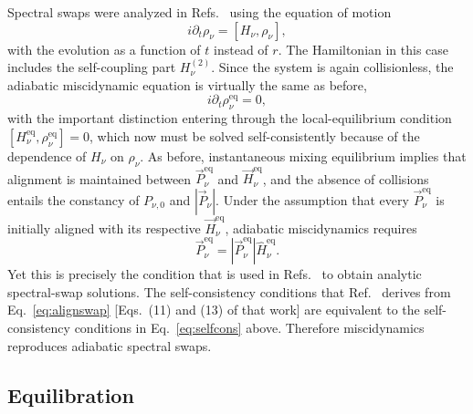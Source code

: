 \documentclass[aps,prd,twocolumn,groupedaddress,preprintnumbers]{revtex4-2}
\begin{document}
Spectral swaps were analyzed in Refs.~\cite{raffelt2007, raffelt2007c} using the equation of motion
\begin{equation}
    i \partial_t \rho_\nu = [H_\nu, \rho_\nu],
\end{equation}
with the evolution as a function of $t$ instead of $r$. The Hamiltonian in this case includes the self-coupling part $H_\nu^{(2)}$. Since the system is again collisionless, the adiabatic miscidynamic equation is virtually the same as before,
\begin{equation}
    i \partial_t \rho_\nu^\textrm{eq} = 0, \label{eq:miscswap}
\end{equation}
with the important distinction entering through the local-equilibrium condition $[H^{\textrm{eq}}_\nu, \rho^{\textrm{eq}}_\nu] = 0$, which now must be solved self-consistently because of the dependence of $H_\nu$ on $\rho_\nu$. As before, instantaneous mixing equilibrium implies that alignment is maintained between $\vec{P}_\nu^{\textrm{eq}}$ and $\vec{H}_\nu^{\textrm{eq}}$, and the absence of collisions entails the constancy of $P_{\nu,0}$ and $|\vec{P}_\nu|$. Under the assumption that every $\vec{P}_\nu^{\textrm{eq}}$ is initially aligned with its respective $\vec{H}_\nu^{\textrm{eq}}$, adiabatic miscidynamics requires
\begin{equation}
    \vec{P}_\nu^{\textrm{eq}} = |\vec{P}_\nu^{\textrm{eq}}| \hat{H}_\nu^{\textrm{eq}}. \label{eq:alignswap}
\end{equation}
Yet this is precisely the condition that is used in Refs.~\cite{raffelt2007,raffelt2007c} to obtain analytic spectral-swap solutions. The self-consistency conditions that Ref.~\cite{raffelt2007} derives from Eq.~\eqref{eq:alignswap} [Eqs.~(11) and (13) of that work] are equivalent to the self-consistency conditions in Eq.~\eqref{eq:selfcons} above. Therefore miscidynamics reproduces adiabatic spectral swaps.



















\subsection{Equilibration}
\end{document}
